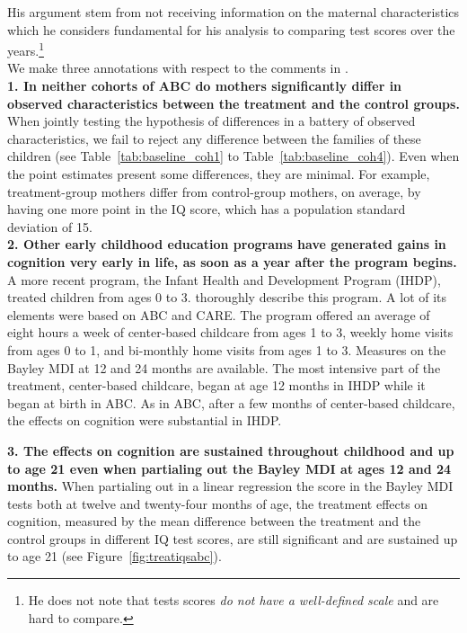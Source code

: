 \begin{appendices}
\noindent His argument stem from not receiving information on the maternal characteristics which he considers fundamental for his analysis to comparing test scores over the years.\footnote{He does not note that tests scores \textit{do not have a well-defined scale} and are hard to compare.}\\ 

\noindent We make three annotations with respect to the comments in \citet{Spitz_1992_ABC-Retardation}.\\ 

\noindent \textbf{1. In neither cohorts of ABC do mothers significantly differ in observed characteristics between the treatment and the control groups.} When jointly testing the hypothesis of differences in a battery of observed characteristics, we fail to reject any difference between the families of these children (see Table~\ref{tab:baseline_coh1} to Table~\ref{tab:baseline_coh4}). Even when the point estimates present some differences, they are minimal. For example, treatment-group mothers differ from control-group mothers, on average, by having one more point in the IQ score, which has a population standard deviation of 15.\\

\noindent \textbf{2. Other early childhood education programs have generated gains in cognition very early in life, as soon as a year after the program begins.} A more recent program, the Infant Health and Development Program (IHDP), treated children from ages 0 to 3. \citet{Gross_Spiker_etal_1997_BOOKHelpinglowbirth} thoroughly describe this program. A lot of its elements were based on ABC and CARE. The program offered an average of eight hours a week of center-based childcare from ages 1 to 3, weekly home visits from ages 0 to 1, and bi-monthly home visits from ages 1 to 3. Measures on the Bayley MDI at 12 and 24 months are available. The most intensive part of the treatment, center-based childcare, began at age 12 months in IHDP while it began at birth in ABC. As in ABC, after a few months of center-based childcare, the effects on cognition were substantial in IHDP.



\noindent \textbf{3. The effects on cognition are sustained throughout childhood and up to age 21 even when partialing out the Bayley MDI at ages 12 and 24 months.} When partialing out in a linear regression the score in the Bayley MDI tests both at twelve and twenty-four months of age, the treatment effects on cognition, measured by the mean difference between the treatment and the control groups in different IQ test scores, are still significant and are sustained up to age 21 (see Figure~\ref{fig:treatiqsabc}).


\end{appendices}
